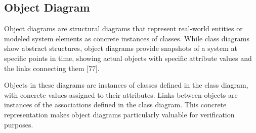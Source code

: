 

\subsection{Object Diagram}
Object diagrams are structural diagrams that represent real-world entities or 
modeled system elements as concrete instances of classes. While class diagrams 
show abstract structures, object diagrams provide snapshots of a system at specific 
points in time, showing actual objects with specific attribute values and the links 
connecting them [77].

Objects in these diagrams are instances of classes defined in the class diagram, 
with concrete values assigned to their attributes. Links between objects are 
instances of the associations defined in the class diagram. This concrete 
representation makes object diagrams particularly valuable for verification purposes.

